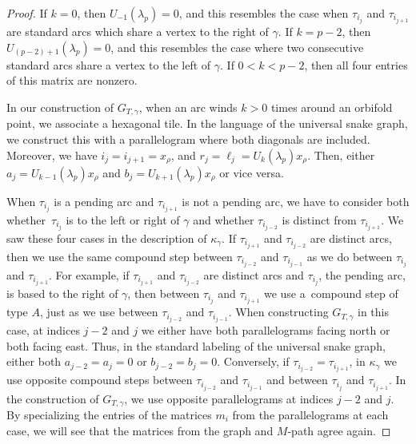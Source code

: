\begin{proof}
If $k = 0$, then $U_{-1}(\lambda_p) = 0$, and this resembles the case when $\tau_{i_j}$ and $\tau_{i_{j+1}}$ are standard arcs which share a vertex to the right of $\gamma$. If $k = p-2$, then $U_{(p-2)+1}(\lambda_p) = 0$, and this resembles the case where two consecutive standard arcs share a vertex to the left of $\gamma$. If $0 < k < p-2$, then all four entries of this matrix are nonzero.

In our construction of $G_{T,\gamma}$, when an arc winds $k > 0$ times around an orbifold point, we associate a hexagonal tile. In the language of the universal snake graph, we construct this with a parallelogram where both diagonals are included. Moreover, we have $i_j = i_{j+1} = x_\rho$, and $r_j = \ell_j = U_k(\lambda_p) x_\rho$. Then, either $a_j = U_{k-1}(\lambda_p) x_\rho$ and $b_j = U_{k+1}(\lambda_p) x_\rho$ or vice versa.

When $\tau_{i_j}$ is a pending arc and $\tau_{i_{j+1}}$ is not a pending arc, we have to consider both whether~$\tau_{i_j}$ is to the left or right of $\gamma$ and whether $\tau_{i_{j-2}}$ is distinct from $\tau_{i_{j+1}}$. We saw these four cases in the description of $\kappa_\gamma$. If $\tau_{i_{j+1}}$ and $\tau_{i_{j-2}}$ are distinct arcs, then we use the same compound step between $\tau_{i_{j-2}}$ and $\tau_{i_{j-1}}$ as we do between $\tau_{i_{j}}$ and $\tau_{i_{j+1}}$. For example, if $\tau_{i_{j+1}}$ and $\tau_{i_{j-2}}$ are distinct arcs and $\tau_{i_j}$, the pending arc, is based to the right of $\gamma$, then between $\tau_{i_j}$ and $\tau_{i_{j+1}}$ we use a~compound step of type $A$, just as we use between $\tau_{i_{j-2}}$ and $\tau_{i_{j-1}}$. When constructing $G_{T,\gamma}$ in this case, at indices $j-2$ and $j$ we either have both parallelograms facing north or both facing east. Thus, in the standard labeling of the universal snake graph, either both $a_{j-2} = a_j = 0$ or $b_{j-2} = b_j = 0$. Conversely, if $\tau_{i_{j-2}} = \tau_{i_{j+1}}$, in $\kappa_\gamma$ we use opposite compound steps between $\tau_{i_{j-2}}$ and $\tau_{i_{j-1}}$ and between $\tau_{i_{j}}$ and $\tau_{i_{j+1}}$. In the construction of $G_{T,\gamma}$, we use opposite parallelograms at indices $j-2$ and $j$. By specializing the entries of the matrices $m_i$ from the parallelograms at each case, we will see that the matrices from the graph and $M$-path agree again.


\end{proof}
